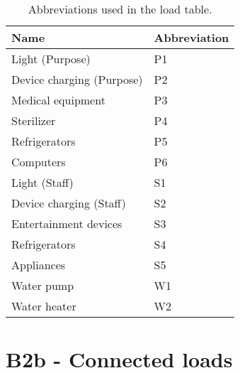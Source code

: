 \begin{table}[ht!]
\centering
    \begin{tabular}{ m{7cm} | m{1.5cm}} 
    \toprule
    \toprule
    \textbf{Name} & \textbf{Abbreviation} \\
    \midrule
    Light (Purpose)& P1  \\
    Device charging (Purpose)   &  P2  \\
    Medical equipment & P3  \\
    Sterilizer   &  P4  \\
    Refrigerators & P5  \\
    Computers  & P6  \\
    \hline
    Light (Staff) & S1  \\
    Device charging (Staff) &  S2  \\
    Entertainment devices   & S3  \\
    Refrigerators   & S4 \\
    Appliances   & S5 \\
    \hline
    Water pump  & W1  \\
    Water heater & W2  \\
    \bottomrule
    \bottomrule
    \end{tabular}
\caption[User survey- load Abbreviations]{Abbreviations used in the load table.}
\label{tab:load_abbreviations}
\end{table}



\newpage
\section*{\large{B2b - Connected loads}}
\vspace*{1cm}

